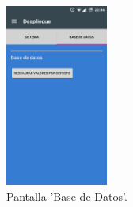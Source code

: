 \documentclass[../PFC.tex]{subfiles}
\begin{document}
\begin{figure}[H]
  \centering
  \includegraphics[width=0.3\textwidth]{./img/app/despliegueBaseDeDatos}
  \caption{Pantalla 'Base de Datos'.}
  \label{img:app:baseDatos1}
\end{figure}  

\end{document}
